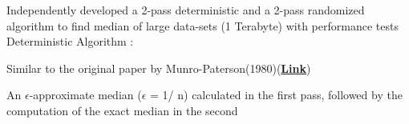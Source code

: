 \documentclass[letterpaper]{Formatting}
\begin{document}
\begin{minipage}[t]{0.66\textwidth}
Independently developed a 2-pass deterministic and a 2-pass randomized algorithm to find median of large data-sets (1 Terabyte) with performance tests\\\vspace{1ex}
Deterministic Algorithm :\vspace{1ex}
\vspace{\topsep} %
\footnotesize {
\begin{tightitemize}
\item Similar to the original paper by Munro-Paterson(1980)(\textbf{\href{http://polylogblog.files.wordpress.com/2009/08/80munro-median.pdf}{Link}})
\item An $\epsilon$-approximate median ($\epsilon$ = 1/ n) calculated in the first pass, followed by the computation of the exact median in the second
\end{tightitemize}
}
\vspace{2ex}

\end{minipage}
\end{document}
